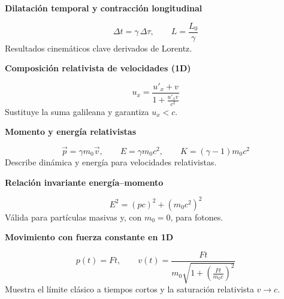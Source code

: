 \documentclass[12pt, a4paper]{article}
\theoremstyle{plain}
\theoremstyle{definition}
\theoremstyle{remark}
\newcommand{\ve}[1]{\vec{#1}}
\newcommand{\formulaname}[1]{\textbf{#1}\par\vspace{2pt}}
\begin{document}
\formulaname{Dilatación temporal y contracción longitudinal}
\begin{equation}
  \Delta t=\gamma\,\Delta\tau,\qquad
  L=\frac{L_0}{\gamma}
\end{equation}
Resultados cinemáticos clave derivados de Lorentz.

\formulaname{Composición relativista de velocidades (1D)}
\begin{equation}
  u_x=\frac{u'_x+v}{1+\frac{u'_x v}{c^2}}
\end{equation}
Sustituye la suma galileana y garantiza $u_x<c$.

\formulaname{Momento y energía relativistas}
\begin{equation}
  \ve{p}=\gamma m_0\ve{v},\qquad
  E=\gamma m_0c^2,\qquad
  K=(\gamma-1)m_0c^2
\end{equation}
Describe dinámica y energía para velocidades relativistas.

\formulaname{Relación invariante energía--momento}
\begin{equation}
  E^2=(pc)^2+(m_0c^2)^2
\end{equation}
Válida para partículas masivas y, con $m_0=0$, para fotones.

\formulaname{Movimiento con fuerza constante en 1D}
\begin{equation}
  p(t)=Ft,\qquad
  v(t)=\frac{Ft}{m_0\sqrt{1+\left(\frac{Ft}{m_0c}\right)^2}}
\end{equation}
Muestra el límite clásico a tiempos cortos y la saturación relativista $v\to c$.
\end{document}

